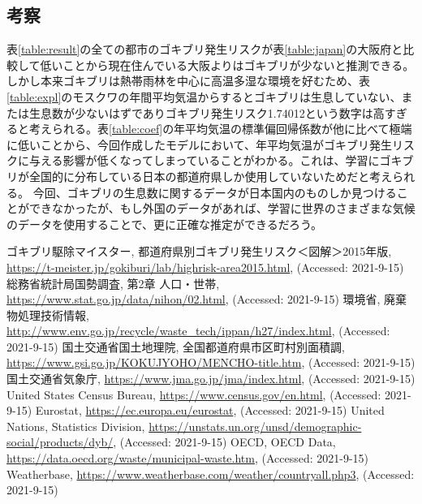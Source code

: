 \documentclass[a4paper,10pt,twocolumn]{jsarticle}
\begin{document}
\subsection{考察}
表\ref{table:result}の全ての都市のゴキブリ発生リスクが表\ref{table:japan}の大阪府と比較して低いことから現在住んでいる大阪よりはゴキブリが少ないと推測できる。しかし本来ゴキブリは熱帯雨林を中心に高温多湿な環境を好むため、表\ref{table:expl}のモスクワの年間平均気温からするとゴキブリは生息していない、または生息数が少ないはずでありゴキブリ発生リスク1.74012という数字は高すぎると考えられる。表\ref{table:coef}の年平均気温の標準偏回帰係数が他に比べて極端に低いことから、今回作成したモデルにおいて、年平均気温がゴキブリ発生リスクに与える影響が低くなってしまっていることがわかる。これは、学習にゴキブリが全国的に分布している日本の都道府県しか使用していないためだと考えられる。
今回、ゴキブリの生息数に関するデータが日本国内のものしか見つけることができなかったが、もし外国のデータがあれば、学習に世界のさまざまな気候のデータを使用することで、更に正確な推定ができるだろう。

\begin{thebibliography}{99}
	ゴキブリ駆除マイスター,
	都道府県別ゴキブリ発生リスク＜図解＞2015年版,
	\url{https://t-meister.jp/gokiburi/lab/highrisk-area2015.html},
	(Accessed: 2021-9-15)
	総務省統計局国勢調査,
	第2章 人口・世帯,
	\url{https://www.stat.go.jp/data/nihon/02.html},
	(Accessed: 2021-9-15)
	環境省,
	廃棄物処理技術情報,
	\url{http://www.env.go.jp/recycle/waste_tech/ippan/h27/index.html},
	(Accessed: 2021-9-15)
	国土交通省国土地理院,
	全国都道府県市区町村別面積調,
	\url{https://www.gsi.go.jp/KOKUJYOHO/MENCHO-title.htm},
	(Accessed: 2021-9-15)
	国土交通省気象庁,
	\url{https://www.jma.go.jp/jma/index.html},
	(Accessed: 2021-9-15)
	United States Census Bureau,
	\url{https://www.census.gov/en.html},
	(Accessed: 2021-9-15)
	Eurostat,
	\url{https://ec.europa.eu/eurostat},
	(Accessed: 2021-9-15)
	United Nations,
	Statistics Division,
	\url{https://unstats.un.org/unsd/demographic-social/products/dyb/},
	(Accessed: 2021-9-15)
	OECD,
	OECD Data,
	\url{https://data.oecd.org/waste/municipal-waste.htm},
	(Accessed: 2021-9-15)
	Weatherbase,
	\url{https://www.weatherbase.com/weather/countryall.php3},
	(Accessed: 2021-9-15)

\end{thebibliography}


\end{document}
